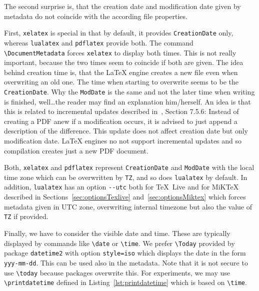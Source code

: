 \documentclass[a4paper]{article}%
\newcommand{\pdflatex}{\texttt{pdflatex}}
\newcommand{\lualatex}{\texttt{lualatex}}
\newcommand{\xelatex}{\texttt{xelatex}}
\newcommand{\cmd}[1]{\texttt{\textbackslash#1}}
\newcommand{\texlive}{\TeX~Live}
\newcommand{\miktex}{MiKTeX}
\begin{document}
The second surprise is, that the creation date and modification date given by metadata 
do not coincide with the according file properties. 

First, \xelatex{} is special in that by default, it provides \texttt{CreationDate} only, 
whereas \lualatex{} and \pdflatex{} provide both. 
The command \cmd{DocumentMetadata} forces \xelatex{} to display both times. 
This is not really important, because the two times seem to coincide if both are given. 
The idea behind creation time is, that the \LaTeX{} engine creates a new file 
even when overwriting an old one. 
The time when starting to overwrite seems to be the \texttt{CreationDate}. 
Why the \texttt{ModDate} is the same and not the later time when writing is finished, 
well\dots the reader may find an explanation him/herself. 
An idea is that this is related to incremental updates described in~\cite{Pdf20}, Section 7.5.6: 
Instead of creating a PDF anew if a modification occurs, 
it is advised to just append a description of the difference. 
This update does not affect creation date but only modification date. 
\LaTeX{} engines no not support incremental updates 
and so compilation creates just a new PDF document. 

Both, \xelatex{} and \pdflatex{} represent \texttt{CreationDate} and \texttt{ModDate} 
with the local time zone which can be overwritten by \texttt{TZ}, and so does \lualatex{} by default. 
In addition, \lualatex{} has an option \texttt{-{}-utc} 
both for \texlive{} and for \miktex{} 
described in Sections~\ref{sec:optionsTexlive} and~\ref{sec:optionsMiktex} 
which forces metadata given in UTC zone, 
overwriting internal timezone but also the value of \texttt{TZ} if provided. 
\medskip


Finally, we have to consider the visible date and time. 
These are typically displayed by commands like \cmd{date} or \cmd{time}. 
We prefer \cmd{Today} 
provided by package \texttt{datetime2} with option \texttt{style=iso} 
which displays the date in the form \texttt{yyy-mm-dd}. 
This can be used also in the metadata. %
Note that it is not secure to use \cmd{today} because packages overwrite this. 
For experiments, we may use \cmd{printdatetime} defined in Listing~\ref{lst:printdatetime} 
which is based on \cmd{time}. 


\end{document}
